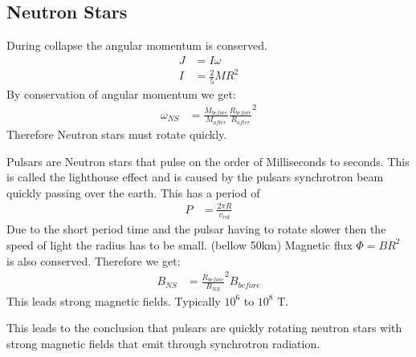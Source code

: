 \documentclass[11pt,a4paper]{article}
\begin{document}
\subsection{Neutron Stars}
During collapse the angular momentum is conserved. 
\begin{align*}
    J &= I \omega \\ 
    I &= \frac 2 5 MR^2
\end{align*}
By conservation of angular momentum we get: 
\begin{align*}
    \omega_{NS} &= \frac {M_{before}}{M_{after}} \frac {R_{before}}{R_{after}}^2  
\end{align*}
Therefore Neutron stars must rotate quickly. 

Pulsars are Neutron stars that pulse on the order of Milliseconds to seconds. 
This is called the lighthouse effect and is caused by the pulsars synchrotron beam quickly passing over the earth. 
This has a period of
\begin{align*}
    P &= \frac {2 \pi R}{v_{rot} }
\end{align*}
Due to the short period time and the pulsar having to rotate slower then the speed of light the radius has to be small. (bellow 50km)
Magnetic flux $\Phi = BR^2$ is also conserved. 
Therefore we get:
\begin{align*}
    B_{NS} &= \frac {R_{before}} {R_{NS}}^2 B_{before} 
\end{align*}
This leads strong magnetic fields. 
Typically $10^6$ to $10^8$ T. 

This leads to the conclusion that pulsars are quickly rotating neutron stars with strong magnetic fields that emit through synchrotron radiation.
\end{document}
